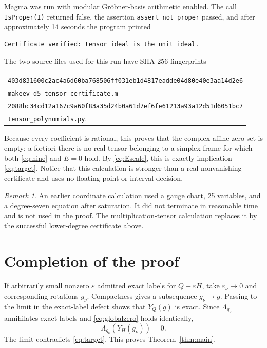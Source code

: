 \documentclass[11pt,reqno]{amsart}
\theoremstyle{remark}
\newtheorem{remark}[theorem]{Remark}
\newcommand{\eps}{\varepsilon}
\begin{document}
Magma was run with modular Gr\"obner-basis arithmetic enabled.  The call
\texttt{IsProper(I)} returned false, the assertion
\texttt{assert not proper} passed, and after approximately 14 seconds the
program printed
\begin{verbatim}
Certificate verified: tensor ideal is the unit ideal.
\end{verbatim}
The two source files used for this run have SHA-256 fingerprints
\begin{center}
\begin{tabular}{@{}l@{}}
\texttt{403d831600c2ac4a6d60ba768506ff031eb1d4817eadde04d80e40e3aa14d2e6}\\
\quad\texttt{makeev\_d5\_tensor\_certificate.m}\\[2pt]
\texttt{2088bc34cd12a167c9a60f83a35d24b0a61d7ef6fe61213a93a12d51d6051bc7}\\
\quad\texttt{tensor\_polynomials.py}.
\end{tabular}
\end{center}
Because every coefficient is rational, this proves that the complex affine
zero set is empty; a fortiori there is no real tensor belonging to a simplex
frame for which both \eqref{eq:nine} and $E=0$ hold.  By
\eqref{eq:Escale}, this is exactly implication \eqref{eq:target}.  Notice that
this calculation is stronger than a real nonvanishing certificate and uses no
floating-point or interval decision.

\begin{remark}
An earlier coordinate calculation used a gauge chart, 25 variables, and a
degree-seven equation after saturation.  It did not terminate in reasonable
time and is not used in the proof.  The multiplication-tensor calculation
replaces it by the successful lower-degree certificate above.
\end{remark}

\section{Completion of the proof}

If arbitrarily small nonzero $\eps$ admitted
exact labels for $Q+\eps H$, take $\eps_\nu\to0$ and corresponding rotations
$g_\nu$.  Compactness gives a subsequence $g_\nu\to g$.  Passing to the limit
in the exact-label defect shows that $Y_Q(g)$ is exact.  Since $\Lambda_{g_\nu}$
annihilates exact labels and \eqref{eq:globalzero} holds identically,
\[
 \Lambda_{g_\nu}(Y_H(g_\nu))=0.
\]
The limit contradicts \eqref{eq:target}.  This proves
Theorem~\ref{thm:main}.
\end{document}
